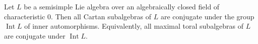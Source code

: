 Let $L$ be a semisimple Lie algebra over an algebraically closed field of characteristic $0$. Then all Cartan subalgebras of $L$ are conjugate under the group $\operatorname{Int} L$ of inner automorphisms. Equivalently, all maximal toral subalgebras of $L$ are conjugate under $\operatorname{Int} L$.
